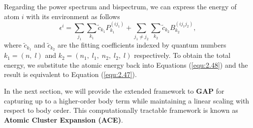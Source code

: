 Regarding the power spectrum and bispectrum, we can express the energy of atom $i$ with its environment as follows
\begin{equation}
    \label{equ:2.58}
      \epsilon^{i} = \sum_{j_{1}}\sum_{k_{1}}
      \tilde{c}_{k_{1}}
      P^{(ij_{1})}_{k_{1}} + \sum_{j_{1}\neq j_{2}}\sum_{k_{2}}
      \tilde{c}_{k_{2}}
      B^{(ij_{1}j_{2})}_{k_{2}}
      ,
\end{equation}
where $\tilde{c}_{k_{1}}$ and $\tilde{c}_{k_{2}}$ are the fitting coefficients indexed by quantum numbers $k_{1} = (n,\;l)$ and $k_{2} = (n_1,\;l_1,\;n_2,\;l_2,\;l)$ respectively. To obtain the total energy, we substitute the atomic energy back into Equations (\ref{equ:2.48}) and the result is equivalent to Equation (\ref{equ:2.47}).

In the next section, we will provide the extended framework to \textbf{GAP} for capturing up to a higher-order body term while maintaining a linear scaling with respect to body order. 
This computationally tractable framework is known as \textbf{Atomic Cluster Expansion (ACE)}.





